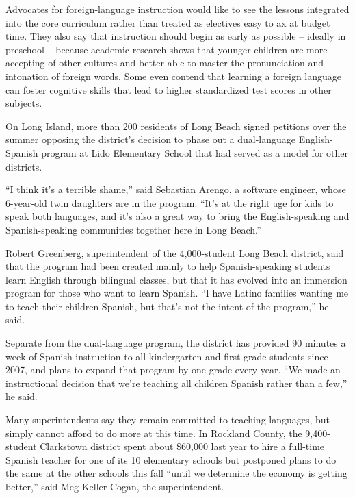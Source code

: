 ﻿\documentclass[12pt]{article}
\begin{document}
Advocates for foreign-language instruction would like to see the lessons integrated into the core
curriculum rather than treated as electives easy to ax at budget time. They also say that
instruction should begin as early as possible -- ideally in preschool -- because academic research
shows that younger children are more accepting of other cultures and better able to master the
pronunciation and intonation of foreign words. Some even contend that learning a foreign language
can foster\cite{foster} cognitive\cite{cognitive} skills that lead to higher standardized test
scores in other subjects.

On Long Island, more than 200 residents of Long Beach signed petitions over the summer opposing the
district's decision to phase out a dual-language English-Spanish program at Lido Elementary School
that had served as a model for other districts.

``I think it's a terrible shame,'' said Sebastian Arengo, a software engineer, whose 6-year-old twin
daughters are in the program. ``It's at the right age for kids to speak both languages, and it's
also a great way to bring the English-speaking and Spanish-speaking communities together here in
Long Beach.''

Robert Greenberg, superintendent\cite{superintendent} of the 4,000-student Long Beach district, said
that the program had been created mainly to help Spanish-speaking students learn English through
bilingual classes, but that it has evolved into an immersion\cite{immersion} program for those who
want to learn Spanish. ``I have Latino families wanting me to teach their children Spanish, but
that's not the intent of the program,'' he said.

Separate from the dual-language program, the district has provided 90 minutes a week of Spanish
instruction to all kindergarten and first-grade students since 2007, and plans to expand that
program by one grade every year. ``We made an instructional decision that we're teaching all
children Spanish rather than a few,'' he said.

Many superintendents say they remain committed to teaching languages, but simply cannot afford to do
more at this time. In Rockland County, the 9,400-student Clarkstown district spent about \$60,000
last year to hire a full-time Spanish teacher for one of its 10 elementary schools but postponed
plans to do the same at the other schools this fall ``until we determine the economy is getting
better,'' said Meg Keller-Cogan, the superintendent.
\end{document}
